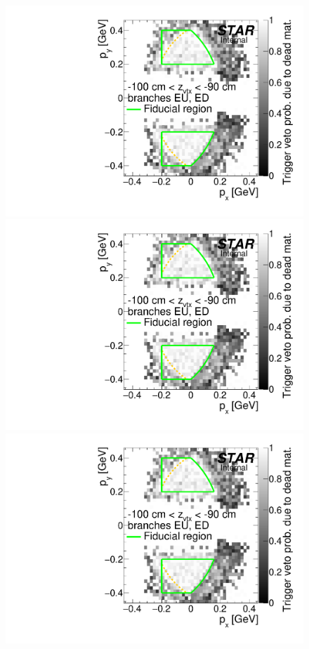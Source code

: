 \begin{figure}[hb]\ContinuedFloat
\centering
\parbox{0.495\textwidth}{
  \centering
  \includegraphics[width=\linewidth,page=9]{graphics/corrections/mcDeadMatProbPxPy.pdf}\\
  \includegraphics[width=\linewidth,page=11]{graphics/corrections/mcDeadMatProbPxPy.pdf}\\
  \includegraphics[width=\linewidth,page=13]{graphics/corrections/mcDeadMatProbPxPy.pdf}
}
\end{figure}

